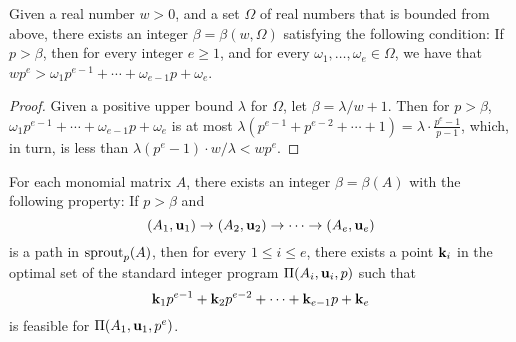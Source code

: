 \documentclass{amsart}
\begin{document}
\begin{lemma}
   \label{positive-polynomial: L}
   Given a real number $w > 0$, and a set $\Omega$ of real numbers that is bounded from above, there exists an integer $\beta = \beta(w, \Omega)$ satisfying the following condition\textup:
   If $p > \beta$, then for every integer $e \geq 1$, and for every $\omega_1, \ldots, \omega_e \in \Omega$, we have that $wp^{e} >  \omega_1 p^{e-1} + \cdots + \omega_{e-1} p + \omega_e$.
\end{lemma}

\begin{proof}
   Given a positive upper bound $\lambda$ for $\Omega$, let $\beta = \lambda/w  + 1$.
   Then for $p>\beta$, $\omega_1 p^{e-1} + \cdots + \omega_{e-1}  p + \omega_e$ is at most $\lambda(p^{e-1} + p^{e-2} + \cdots + 1) = \lambda \cdot \frac{p^e-1}{p-1}$, which, in turn, is less than $\lambda (p^e-1) \cdot w/\lambda < w p^e$.
\end{proof}

\begin{theorem}
\label{ILL: T}
   For each monomial matrix $A$, there exists an integer $\beta = \beta(A)$ with the following property\textup:
   If $p>\beta$ and \[ (A_1, \mathbf{u}_1) \to (A_2, \mathbf{u}_2) \to \cdots \to (A_e, \mathbf{u}_e)\] is a path in $\operatorname{sprout}_p(A)$, then for every $1 \leq i \leq e$, there exists a point $\mathbf{k}_i$ in the optimal set of the standard integer program $\Pi(A_i, \mathbf{u}_i,p)$  such that
   \[
      \mathbf{k}_1 p^{e-1} + \mathbf{k}_2 p^{e-2} + \cdots + \mathbf{k}_{e-1} p + \mathbf{k}_e
   \]
   is feasible for $\Pi(A_1, \mathbf{u}_1, p^e)$.
 \end{theorem}
\end{document}
